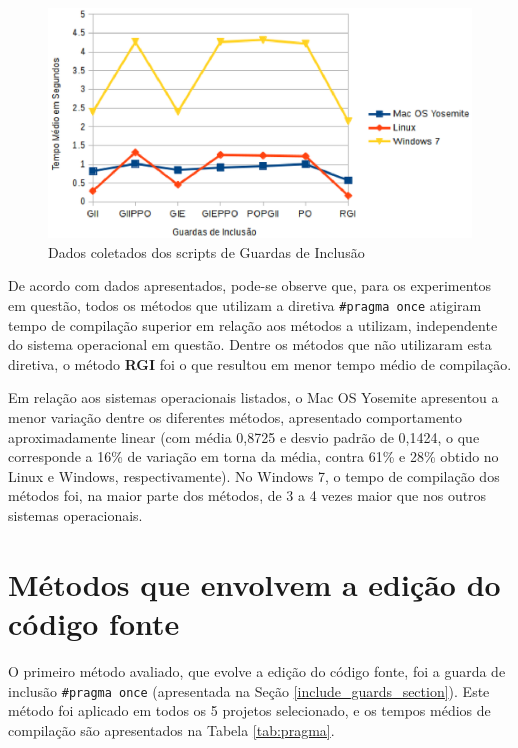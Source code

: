 \begin{figure}[!h]
    \centering
        \includegraphics{figuras/graficos/benchmark.eps}
    \caption{Dados coletados dos scripts de Guardas de Inclusão}
    \label{benchmark_guardas_de_inclusao}
\end{figure}

De acordo com dados apresentados, pode-se observe que, para os experimentos em questão, todos os métodos que utilizam a diretiva 
\texttt{\#pragma once} atigiram tempo de compilação superior em relação aos métodos a utilizam, independente do sistema operacional em questão.
Dentre os métodos que não utilizaram esta diretiva, o método \textbf{RGI} foi o que resultou em menor tempo médio de compilação.

Em relação aos sistemas operacionais listados, o Mac OS Yosemite apresentou a menor variação dentre os diferentes métodos, apresentado comportamento 
aproximadamente linear (com média 0,8725 e desvio padrão de 0,1424, o que corresponde a 16\% de variação em torna da média, contra 61\% e 28\% obtido
no Linux e Windows, respectivamente).  No Windows 7, o tempo de compilação dos métodos foi, na maior parte dos métodos, de 3 a 4 vezes maior que nos outros sistemas operacionais. 


\section{Métodos que envolvem a edição do código fonte}

O primeiro método avaliado, que evolve a edição do código fonte, foi a guarda de inclusão \texttt{\#pragma once} (apresentada na Seção \ref{include_guards_section}). Este método foi aplicado em todos os 5 projetos selecionado, e os tempos médios de compilação são apresentados na Tabela \ref{tab:pragma}.

